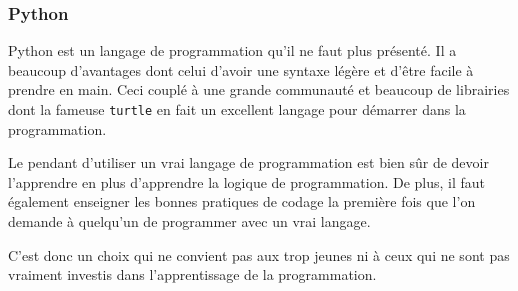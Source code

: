 \subsubsection{Python}
Python est un langage de programmation qu'il ne faut plus présenté. Il a beaucoup d'avantages dont celui d'avoir une syntaxe légère et d'être facile à prendre en main. Ceci couplé à une grande communauté et beaucoup de librairies dont la fameuse \texttt{turtle} en fait un excellent langage pour démarrer dans la programmation.

Le pendant d'utiliser un vrai langage de programmation est bien sûr de devoir l'apprendre en plus d'apprendre la logique de programmation. De plus, il faut également enseigner les bonnes pratiques de codage la première fois que l'on demande à quelqu'un de programmer avec un vrai langage. 

C'est donc un choix qui ne convient pas aux trop jeunes ni à ceux qui ne sont pas vraiment investis dans l'apprentissage de la programmation.